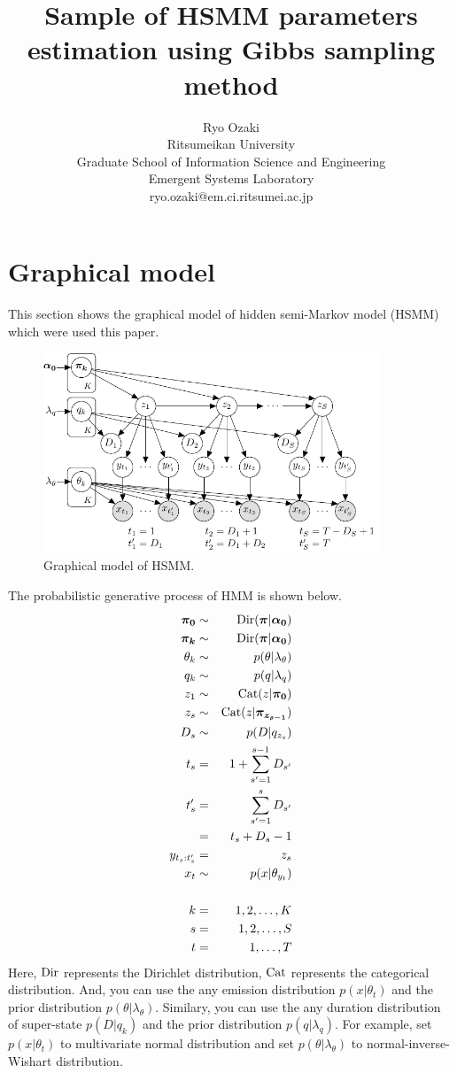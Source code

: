 \documentclass[a4paper]{article}
\title{Sample of HSMM parameters estimation using Gibbs sampling method}
\author{
	Ryo Ozaki\\
	Ritsumeikan University\\
	Graduate School of Information Science and Engineering\\
	Emergent Systems Laboratory\\
	ryo.ozaki@em.ci.ritsumei.ac.jp
}
\DeclareMathOperator{\Cat}{\rm Cat}
\DeclareMathOperator{\Dir}{\rm Dir}
\begin{document}
\maketitle
\section{Graphical model}
This section shows the graphical model of hidden semi-Markov model (HSMM) which were used this paper.
\begin{figure}[ht]
	\begin{center}
		\includegraphics[width=10cm]{fig/HSMM_graphical_model.pdf}
		\caption{Graphical model of HSMM.}
	\end{center}
\end{figure}

The probabilistic generative process of HMM is shown below.
\begin{eqnarray}
	\boldsymbol{\pi_0} &\sim& \Dir(\boldsymbol{\pi} | \boldsymbol{\alpha_0}) \\
	\boldsymbol{\pi_{k}} &\sim& \Dir(\boldsymbol{\pi} | \boldsymbol{\alpha_0}) \\
	\theta_k &\sim& p(\theta | \lambda_\theta) \\
	q_k &\sim& p(q | \lambda_q) \\
	z_1 &\sim& \Cat(z | \boldsymbol{\pi_0})\\
	z_s &\sim& \Cat(z | \boldsymbol{\pi_{z_{s-1}}})\\
	D_s &\sim& p(D | q_{z_s}) \\
	t_s &=& 1 + \sum_{s'=1}^{s-1}{D_{s'}} \\
	t'_s &=& \sum_{s'=1}^{s}{D_{s'}} \\
	&=& t_s + D_s - 1 \\
	y_{t_s:t'_s} &=& z_s \\
	x_t &\sim& p(x | \theta_{y_t})\\
	\nonumber \\
	k &=& 1, 2, \ldots, K \\
	s &=& 1, 2, \ldots, S \\
	t &=& 1, \ldots, T
\end{eqnarray}
Here, $\Dir$ represents the Dirichlet distribution, $\Cat$ represents the categorical distribution.
And, you can use the any emission distribution $p(x | \theta_{t})$ and the prior distribution $p(\theta | \lambda_\theta)$.
Similary, you can use the any duration distribution of super-state $p(D | q_k)$ and the prior distribution $p(q | \lambda_q)$.
For example, set $p(x | \theta_{t})$ to multivariate normal distribution and set $p(\theta | \lambda_\theta)$ to normal-inverse-Wishart distribution.
\end{document}
